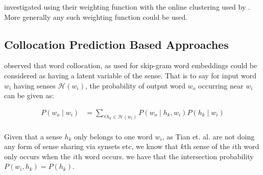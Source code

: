\documentclass[12pt,parskip]{komatufte}
\begin{document}
\textcite{kaageback2015neural} investigated using their weighting function with the online clustering used by \textcite{neelakantan2015efficient}.
More generally any such weighting function could be used.



\subsection{Collocation Prediction Based Approaches}


 observed that word collocation, as used for skip-gram word embeddings could be considered as having a latent variable of the sense.
That is to say for input word $w_i$ having senses $\mathcal{H}(w_i)$,
the probability of output word $w_o$ occurring near $w_i$ can be given as:

\begin{align}
	P(w_o\mid w_i) &= \sum_{\forall h_k \in \mathcal{H}(w_i)} P(w_o \mid h_k, w_i) P(h_k \mid w_i) \label{equ:tianmm} \\
\end{align}

Given that a sense $h_k$ only belongs to one word $w_i$, as Tian et. al. are not doing any form of sense sharing via synsets etc,
we know that $k$th sense of the $i$th word only occurs when the $i$th word occurs.
we have that the intersection probability $P(w_i,h_k) = P(h_k)$.
\end{document}
